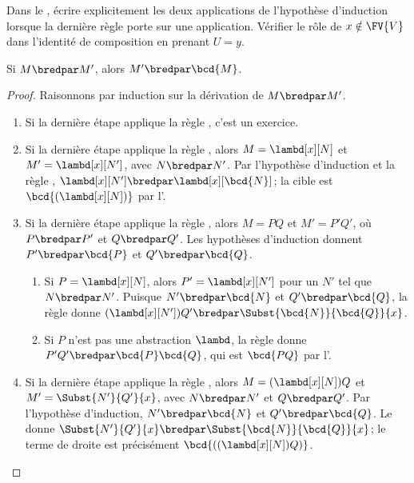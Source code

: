 \documentclass[../../../include/open-logic-section]{subfiles}
\begin{document}
\begin{prob}
Dans le , écrire
explicitement les deux applications de l'hypothèse
d'induction lorsque la dernière règle porte sur une
application. Vérifier le rôle de $x\notin\FV{V}$ dans
l'identité de composition en prenant $U=y$.
\end{prob}

\begin{lem}
Si $M \bredpar M'$, alors
$M' \bredpar \bcd{M}$.
\end{lem}

\begin{proof}
Raisonnons par induction sur la dérivation
de $M \bredpar M'$.
\begin{enumerate}
\item Si la dernière étape applique la règle
  , c'est un exercice.
\item Si la dernière étape applique la règle
  , alors
  $M=\lambd[x][N]$ et
  $M'=\lambd[x][N']$, avec
  $N\bredpar N'$. Par l'hypothèse
  d'induction et la règle ,
  $\lambd[x][N']\bredpar
  \lambd[x][\bcd{N}]$; la cible est
  $\bcd{(\lambd[x][N])}$ par
  l'.
\item Si la dernière étape applique la règle
  , alors
  $M=PQ$ et $M'=P'Q'$, où
  $P\bredpar P'$ et $Q\bredpar Q'$.
  Les hypothèses d'induction donnent
  $P'\bredpar\bcd{P}$ et
  $Q'\bredpar\bcd{Q}$.
  \begin{enumerate}
  \item Si $P=\lambd[x][N]$, alors
    $P'=\lambd[x][N']$ pour un $N'$
    tel que $N\bredpar N'$. Puisque
    $N'\bredpar\bcd{N}$ et
    $Q'\bredpar\bcd{Q}$, la règle
     donne
    $(\lambd[x][N'])Q'\bredpar
    \Subst{\bcd{N}}{\bcd{Q}}{x}$.
  \item Si $P$ n'est pas une abstraction
    $\lambd$, la règle
     donne
    $P'Q'\bredpar\bcd{P}\bcd{Q}$,
    qui est $\bcd{PQ}$ par
    l'.
  \end{enumerate}
\item Si la dernière étape applique la règle
  , alors
  $M=(\lambd[x][N])Q$ et
  $M'=\Subst{N'}{Q'}{x}$, avec
  $N\bredpar N'$ et $Q\bredpar Q'$.
  Par l'hypothèse d'induction,
  $N'\bredpar\bcd{N}$ et
  $Q'\bredpar\bcd{Q}$. Le
   donne
  $\Subst{N'}{Q'}{x}\bredpar
  \Subst{\bcd{N}}{\bcd{Q}}{x}$;
  le terme de droite est précisément
  $\bcd{((\lambd[x][N])Q)}$.
\end{enumerate}
\end{proof}
\end{document}
